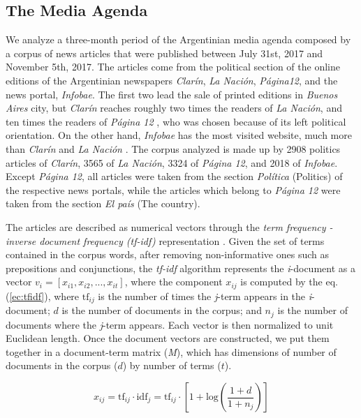 \documentclass{bmcart}
\begin{document}
\subsection*{The Media Agenda}
\par We analyze a three-month period of the Argentinian media agenda composed by a corpus of news articles that were published between July 31st, 2017 and November 5th, 2017. 
The articles come from the political section of the online editions of the Argentinian newspapers \emph{Clar\'in}, \emph{La Naci\'on}, \emph{P\'agina12}, and the news portal, \emph{Infobae}. The first two lead the sale of printed editions in \emph{Buenos Aires} city, but \emph{Clar\'in} reaches roughly two times the readers of \emph{La Naci\'on}, and ten times the readers of \emph{P\'agina 12} \cite{IVC}, who was chosen because of its left political orientation. On the other hand, \emph{Infobae} has the most visited website, much more than \emph{Clar\'in} and \emph{La Naci\'on} \cite{AlexaAR}.
The corpus analyzed is made up by 2908 politics articles of \emph{Clar\'in}, 3565 of \emph{La Naci\'on}, 3324 of \emph{P\'agina 12}, and 2018 of \emph{Infobae}. Except \emph{P\'agina 12}, all articles were taken from the section \emph{Pol\'itica}  (Politics) of the respective news portals, while the articles which belong to \emph{P\'agina 12} were taken from the section \emph{El pa\'is} (The country).

\par The articles are described as numerical vectors through the \textit{term frequency - inverse document frequency (tf-idf)} representation \cite{xu2003document}. 
Given the set of terms contained in the corpus words, after removing non-informative ones such as prepositions and conjunctions, the \textit{tf-idf} algorithm represents the \textit{i}-document as a vector $v_i = [x_{i1}, x_{i2}, ... , x_{it}]$, where the component $x_{ij}$ is computed by the eq.(\ref{ec:tfidf}), where $\textrm{tf}_{ij}$ is the number of times the \textit{j}-term appears in the \textit{i}-document; $d$ is the number of documents in the corpus; and $n_j$ is the number of documents where the \textit{j}-term appears. 
Each vector is then normalized to unit Euclidean length. 
Once the document vectors are constructed, we put them together in a document-term matrix (\emph{M}), which has dimensions of number of documents in the corpus ($d$) by number of terms ($t$).

\begin{equation}
x_{ij} = \textrm{tf}_{ij} \cdot \textrm{idf}_{j} = \textrm{tf}_{ij} \cdot [1 + \textrm{log}(\frac{1 + d}{1 + n_j})] 
\label{ec:tfidf}
\end{equation}
\end{document}
